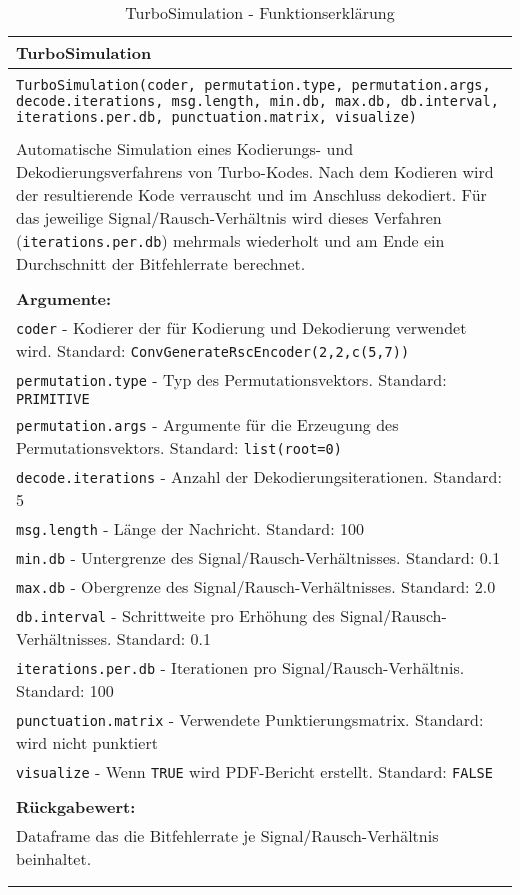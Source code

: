 \begin{longtable}{|p{\textwidth}|}
\hline
\rowcolor{lightblue}TurboSimulation\\
\hline
\\
\texttt{TurboSimulation(coder, permutation.type, permutation.args, decode.iterations, msg.length, min.db, max.db, db.interval, iterations.per.db, punctuation.matrix, visualize)}\\
\\
Automatische Simulation eines Kodierungs- und Dekodierungsverfahrens von Turbo-Kodes. Nach dem Kodieren wird der resultierende Kode verrauscht und im Anschluss dekodiert. Für das jeweilige Signal/Rausch-Verhältnis wird dieses Verfahren (\texttt{iterations.per.db}) mehrmals wiederholt und am Ende ein Durchschnitt der Bitfehlerrate berechnet.\\
\\
\textbf{Argumente:}\\
\texttt{coder} - Kodierer der für Kodierung und Dekodierung verwendet wird. Standard: \texttt{ConvGenerateRscEncoder(2,2,c(5,7))}\\
\texttt{permutation.type} - Typ des Permutationsvektors. Standard: \texttt{PRIMITIVE}\\
\texttt{permutation.args} - Argumente für die Erzeugung des Permutationsvektors. Standard: \texttt{list(root=0)}\\
\texttt{decode.iterations} - Anzahl der Dekodierungsiterationen. Standard: 5\\
\texttt{msg.length} - Länge der Nachricht. Standard: 100\\
\texttt{min.db} - Untergrenze des Signal/Rausch-Verhältnisses. Standard: 0.1\\
\texttt{max.db} - Obergrenze des Signal/Rausch-Verhältnisses. Standard: 2.0\\
\texttt{db.interval} - Schrittweite pro Erhöhung des Signal/Rausch-Verhältnisses. Standard: 0.1\\
\texttt{iterations.per.db} - Iterationen pro Signal/Rausch-Verhältnis. Standard: 100\\
\texttt{punctuation.matrix} - Verwendete Punktierungsmatrix. Standard: wird nicht punktiert\\
\texttt{visualize} - Wenn \texttt{TRUE} wird PDF-Bericht erstellt. Standard: \texttt{FALSE}\\
\\
\textbf{Rückgabewert:}\\
Dataframe das die Bitfehlerrate je Signal/Rausch-Verhältnis beinhaltet.\\
\\
\hline
\caption[TurboSimulation]{TurboSimulation - Funktionserklärung}
\end{longtable}